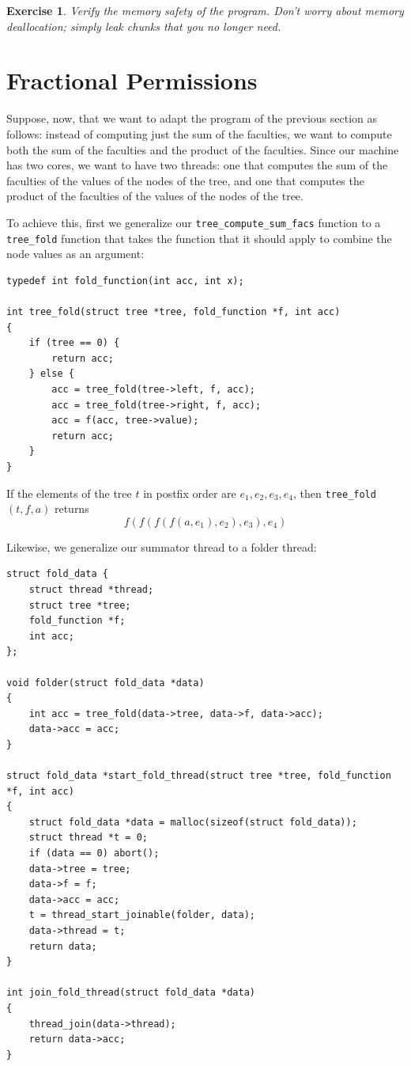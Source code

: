 \documentclass{article}
\newtheorem{exercise}{Exercise}
\begin{document}
\begin{exercise}\label{exercise:threads}
Verify the memory safety of the program. Don't worry about memory deallocation;
simply leak chunks that you no longer need.
\end{exercise}

\section{Fractional Permissions}\label{section:fractions}

Suppose, now, that we want to adapt the program of the previous
section as follows: instead of computing just the sum of the
faculties, we want to compute both the sum of the faculties and
the product of the faculties. Since our machine has two cores,
we want to have two threads: one that computes the sum of the
faculties of the values of the nodes of the tree, and one that
computes the product of the faculties of the values of the
nodes of the tree.

To achieve this, first we generalize our
\lstinline!tree_compute_sum_facs! function to a
\lstinline!tree_fold! function that takes the function that it
should apply to combine the node values as an argument:

\begin{lstlisting}
typedef int fold_function(int acc, int x);

int tree_fold(struct tree *tree, fold_function *f, int acc)
{
    if (tree == 0) {
        return acc;
    } else {
        acc = tree_fold(tree->left, f, acc);
        acc = tree_fold(tree->right, f, acc);
        acc = f(acc, tree->value);
        return acc;
    }
}
\end{lstlisting}

If the elements of the tree $t$ in postfix order are $e_1, e_2,
e_3, e_4$, then \lstinline!tree_fold!$(t, f, a)$ returns
$$f(f(f(f(a, e_1), e_2), e_3), e_4)$$

Likewise, we generalize our summator thread to a folder thread:

\begin{lstlisting}
struct fold_data {
    struct thread *thread;
    struct tree *tree;
    fold_function *f;
    int acc;
};

void folder(struct fold_data *data)
{
    int acc = tree_fold(data->tree, data->f, data->acc);
    data->acc = acc;
}

struct fold_data *start_fold_thread(struct tree *tree, fold_function *f, int acc)
{
    struct fold_data *data = malloc(sizeof(struct fold_data));
    struct thread *t = 0;
    if (data == 0) abort();
    data->tree = tree;
    data->f = f;
    data->acc = acc;
    t = thread_start_joinable(folder, data);
    data->thread = t;
    return data;
}

int join_fold_thread(struct fold_data *data)
{
    thread_join(data->thread);
    return data->acc;
}
\end{lstlisting}
\end{document}
